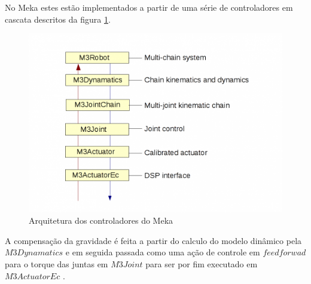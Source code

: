 No Meka estes estão implementados a partir de uma série de controladores em cascata descritos da figura \ref{fig:controlarch}.

\begin{figure}[H]
    \centering
    \includegraphics[width=0.7\linewidth]{tex/figs/controlarch.png}
    \caption{Arquitetura dos controladores do Meka \cite{mekaguide}}
    \label{fig:controlarch}
\end{figure}

A compensação da gravidade é feita a partir do calculo do modelo dinâmico pela $M3Dynamatics$ e em seguida passada como uma ação de controle em $feedforwad$ para o torque das juntas em $M3Joint$ para ser por fim executado em $M3ActuatorEc$ \cite{mekaguide}.




